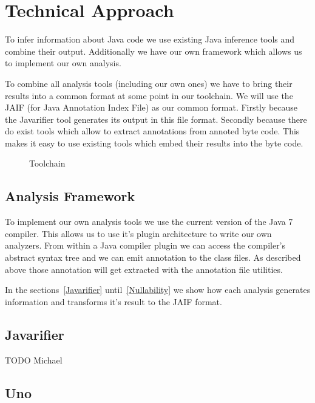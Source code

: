 \section{Technical Approach}
To infer information about Java code we use existing Java inference tools and 
combine their output. Additionally we have our own framework which allows us to
implement our own analysis. 

To combine all analysis tools (including our own ones) we have to bring 
their results into a common format at some point in our toolchain. 
We will use the JAIF (for Java Annotation Index File) as our common format. 
Firstly because the Javarifier tool generates its output in this file format. 
Secondly because there do exist tools which allow to extract annotations from 
annoted byte code. This makes it easy to use existing tools which embed their 
results into the byte code.



\begin{figure}
\centering
{}
\caption{Toolchain}
\label{fig:toolchain}
\end{figure}

\subsection{Analysis Framework}

To implement our own analysis tools we use the current version of the Java 7 compiler.
This allows us to use it's plugin architecture to write our own analyzers. From within
a Java compiler plugin we can access the compiler's abstract syntax tree and we can emit 
annotation to the class files. As described above those annotation will get extracted 
with the annotation file utilities.

In the sections~\ref{Javarifier} until~\ref{Nullability} we show how each analysis 
generates information and transforms it's result to the JAIF format.

\subsection{Javarifier}

TODO Michael


\subsection{Uno}

